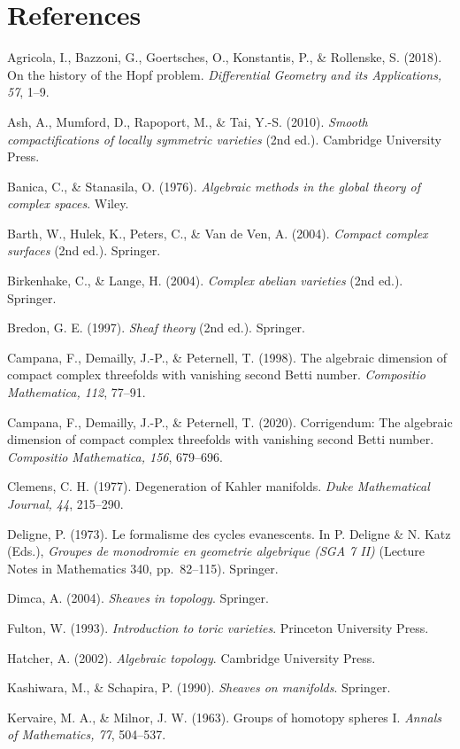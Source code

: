 \documentclass[
  10pt,
  letterpaper,
]{article}
\begin{document}
\section{References}\label{references}

Agricola, I., Bazzoni, G., Goertsches, O., Konstantis, P., \& Rollenske,
S. (2018). On the history of the Hopf problem. \emph{Differential
Geometry and its Applications, 57}, 1--9.

Ash, A., Mumford, D., Rapoport, M., \& Tai, Y.-S. (2010). \emph{Smooth
compactifications of locally symmetric varieties} (2nd ed.). Cambridge
University Press.

Banica, C., \& Stanasila, O. (1976). \emph{Algebraic methods in the
global theory of complex spaces}. Wiley.

Barth, W., Hulek, K., Peters, C., \& Van de Ven, A. (2004).
\emph{Compact complex surfaces} (2nd ed.). Springer.

Birkenhake, C., \& Lange, H. (2004). \emph{Complex abelian varieties}
(2nd ed.). Springer.

Bredon, G. E. (1997). \emph{Sheaf theory} (2nd ed.). Springer.

Campana, F., Demailly, J.-P., \& Peternell, T. (1998). The algebraic
dimension of compact complex threefolds with vanishing second Betti
number. \emph{Compositio Mathematica, 112}, 77--91.

Campana, F., Demailly, J.-P., \& Peternell, T. (2020). Corrigendum: The
algebraic dimension of compact complex threefolds with vanishing second
Betti number. \emph{Compositio Mathematica, 156}, 679--696.

Clemens, C. H. (1977). Degeneration of Kahler manifolds. \emph{Duke
Mathematical Journal, 44}, 215--290.

Deligne, P. (1973). Le formalisme des cycles evanescents. In P. Deligne
\& N. Katz (Eds.), \emph{Groupes de monodromie en geometrie algebrique
(SGA 7 II)} (Lecture Notes in Mathematics 340, pp.~82--115). Springer.

Dimca, A. (2004). \emph{Sheaves in topology}. Springer.

Fulton, W. (1993). \emph{Introduction to toric varieties}. Princeton
University Press.

Hatcher, A. (2002). \emph{Algebraic topology}. Cambridge University
Press.

Kashiwara, M., \& Schapira, P. (1990). \emph{Sheaves on manifolds}.
Springer.

Kervaire, M. A., \& Milnor, J. W. (1963). Groups of homotopy spheres I.
\emph{Annals of Mathematics, 77}, 504--537.
\end{document}
